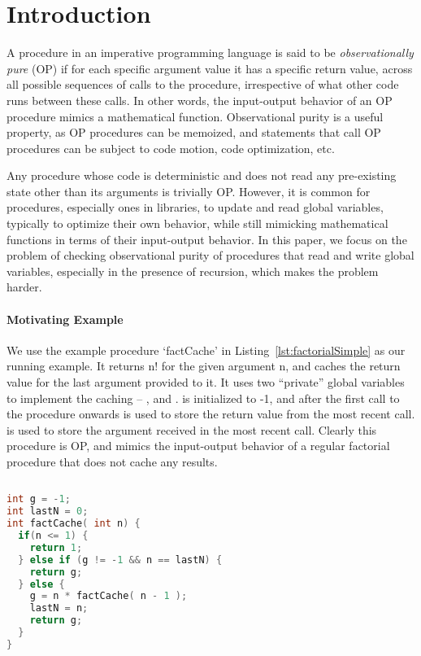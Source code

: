 \section{Introduction}

A procedure in an imperative programming language is said to be
\emph{observationally pure} (OP) if for each specific argument value it has
a specific return value, across all possible sequences of calls to the
procedure, irrespective of what other code runs between these calls.  In
other words, the input-output behavior of an OP procedure mimics a mathematical
function. Observational purity is a useful property, as OP procedures can be memoized, and
statements that call OP procedures can be subject to code motion, code
optimization, etc.

Any procedure whose code is deterministic and does not read any
pre-existing state other than its arguments is trivially OP.
However, it is common for procedures, especially ones in libraries,
to update and read global variables, typically to optimize their own behavior,
while still mimicking mathematical functions in terms of their input-output behavior.
In this paper, we focus on the problem of checking observational purity of
procedures that read and write global variables, especially in the presence of recursion,
which makes the problem harder.

\paragraph{Motivating Example}
We use the example procedure `factCache' in
Listing~\ref{lst:factorialSimple}  as our running example. It
returns n! for the given argument n, and caches the return value for the
last argument provided to it. It uses two ``private'' global variables to
implement the caching -- , and .  is initialized to -1, and after
the first call to the procedure onwards is used to store the return value
from the most recent call.  is used to store the argument received in
the most recent call. Clearly this procedure is OP, and mimics the
input-output behavior of a regular factorial procedure that does not cache
any results. 

\begin{lstlisting}[float,language=c, caption= {Procedure `factCache' :
      returns n! and memoizes result for last argument seen.},
    label=lst:factorialSimple]
  
int g = -1;
int lastN = 0;
int factCache( int n) {
  if(n <= 1) {
    return 1;
  } else if (g != -1 && n == lastN) {
    return g;
  } else {
    g = n * factCache( n - 1 );
    lastN = n;
    return g;
  }
}
\end{lstlisting}

